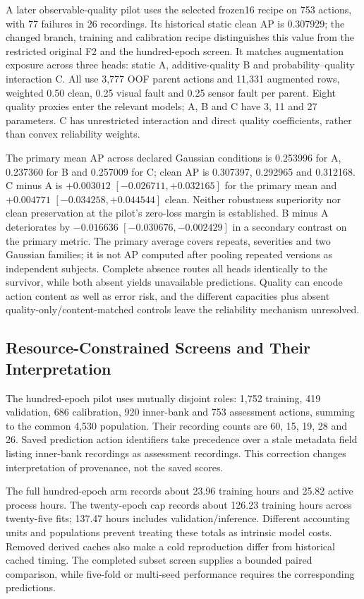 A later observable-quality pilot uses the selected frozen16 recipe on 753 actions, with
77 failures in 26 recordings. Its historical static clean AP is 0.307929; the changed
branch, training and calibration recipe distinguishes this value from the restricted
original F2 and the hundred-epoch screen. It matches augmentation exposure across three
heads: static A, additive-quality B and probability--quality interaction C. All use
3,777 OOF parent actions and 11,331 augmented rows, weighted 0.50 clean, 0.25 visual
fault and 0.25 sensor fault per parent. Eight quality proxies enter the relevant models;
A, B and C have 3, 11 and 27 parameters. C has unrestricted interaction and direct
quality coefficients, rather than convex reliability weights.

The primary mean AP across declared Gaussian conditions is 0.253996 for A, 0.237360 for
B and 0.257009 for C; clean AP is 0.307397, 0.292965 and 0.312168. C minus A is
$+0.003012$ $[-0.026711,+0.032165]$ for the primary mean and $+0.004771$
$[-0.034258,+0.044544]$ clean. Neither robustness superiority nor clean preservation at
the pilot's zero-loss margin is established. B minus A deteriorates by $-0.016636$
$[-0.030676,-0.002429]$ in a secondary contrast on the primary metric. The primary
average covers repeats, severities and two Gaussian families; it is not AP computed
after pooling repeated versions as independent subjects. Complete absence routes all
heads identically to the survivor, while both absent yields unavailable predictions.
Quality can encode action content as well as error risk, and the different capacities
plus absent quality-only/content-matched controls leave the reliability mechanism
unresolved.

\subsection{Resource-Constrained Screens and Their Interpretation}
The hundred-epoch pilot uses mutually disjoint roles: 1,752 training, 419 validation,
686 calibration, 920 inner-bank and 753 assessment actions, summing to the common 4,530
population. Their recording counts are 60, 15, 19, 28 and 26. Saved prediction action
identifiers take precedence over a stale metadata field listing inner-bank recordings as
assessment recordings. This correction changes interpretation of provenance, not the
saved scores.

The full hundred-epoch arm records about 23.96 training hours and 25.82 active process
hours. The twenty-epoch cap records about 126.23 training hours across twenty-five fits;
137.47 hours includes validation/inference. Different accounting units and populations
prevent treating these totals as intrinsic model costs. Removed derived caches also make
a cold reproduction differ from historical cached timing. The completed subset screen
supplies a bounded paired comparison, while five-fold or multi-seed performance requires
the corresponding predictions.

